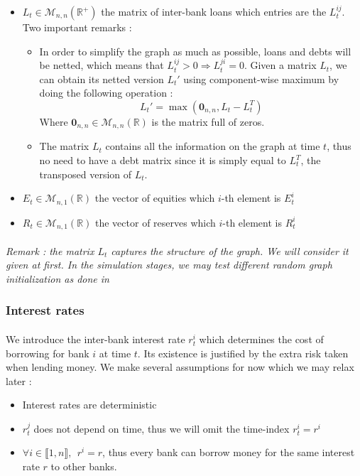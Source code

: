 \documentclass{article}
\begin{document}
\begin{itemize}

    \item $L_t \in \mathcal{M}_{n, n}(\mathbb{R^+})$ the matrix of inter-bank loans which entries are the $L_t^{ij}$. Two important remarks : 
        \begin{itemize}
            \item In order to simplify the graph as much as possible, loans and debts will be netted, which means that $L_t^{ij} > 0 \Rightarrow L_t^{ji}=0$. Given a matrix $L_t$, we can obtain its netted version $L_t'$ using component-wise maximum by doing the following operation : $$L_t' = \max(\mathbf{0}_{n, n}, L_t - L_t^T)$$
            Where $\mathbf{0}_{n, n} \in \mathcal{M}_{n, n}(\mathbb{R})$ is the matrix full of zeros.
            \item The matrix $L_t$ contains all the information on the graph at time $t$, thus no need to have a debt matrix since it is simply equal to $L_t^T$, the transposed version of $L_t$.
        \end{itemize}
    \item $E_t \in \mathcal{M}_{n, 1}(\mathbb{R})$ the vector of equities which $i$-th element is $E_t^i$
    \item $R_t \in \mathcal{M}_{n, 1}(\mathbb{R})$ the vector of reserves which $i$-th element is $R_t^i$
    
\end{itemize}

\paragraph{}
\textit{Remark : the matrix $L_t$  captures the structure of the graph. We will consider it given at first. In the simulation stages, we may test different random graph initialization as done in \cite{11}}

\subsubsection{Interest rates}

\paragraph{}
We introduce the inter-bank interest rate $r^i_t$ which determines the cost of borrowing for bank $i$ at time $t$. Its existence is justified by the extra risk taken when lending money. We make several assumptions for now which we may relax later :
\begin{itemize}
    \item Interest rates are deterministic
    \item $r^j_t$ does not depend on time, thus we will omit the time-index $r^i_t = r^i$
    \item $\forall i \in \llbracket 1, n \rrbracket,~~ r^i = r $, thus every bank can borrow money for the same interest rate $r$ to other banks.
\end{itemize}
\end{document}
